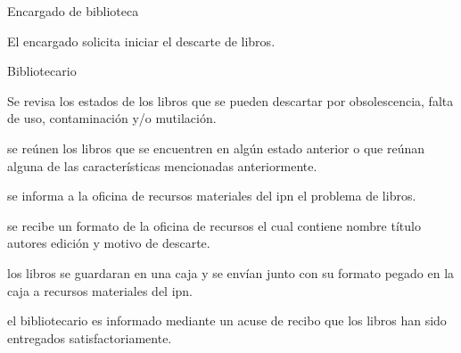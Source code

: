 \begin{PDescripcion}

  \Ppaso Encargado de biblioteca

    \begin{enumerate}

      \Ppaso[\itarea] El encargado solicita iniciar el descarte de libros.
	

    \end{enumerate}
    
    
  \Ppaso Bibliotecario 

    \begin{enumerate}

      \Ppaso[\itarea] Se revisa los estados de los libros que se pueden descartar por obsolescencia, falta de uso, contaminación y/o mutilación.

      \Ppaso[\itarea] se reúnen los libros que se encuentren en algún estado anterior o que reúnan alguna de las características mencionadas anteriormente.
      
      \Ppaso[\itarea] se informa a la oficina de recursos materiales del ipn el problema de libros.

      \Ppaso[\itarea] se recibe un formato de la oficina de recursos el cual contiene nombre título autores edición y motivo de descarte.
      
      
      \Ppaso[\itarea] los libros se guardaran en una caja y se envían junto con su formato pegado en la caja a recursos materiales del ipn.

      \Ppaso[\itarea] el bibliotecario  es informado mediante un acuse de recibo que los libros han sido entregados satisfactoriamente.
      
          \end{enumerate}

\end{PDescripcion}


